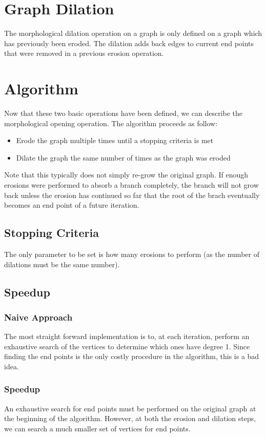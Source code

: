 \documentclass{InsightArticle}
\begin{document}
\section{Graph Dilation}
The morphological dilation operation on a graph is only defined on a graph which has previously been eroded. The dilation adds back edges to current end points that were removed in a previous erosion operation.

\section{Algorithm}
\label{sec:Algorithm}
Now that these two basic operations have been defined, we can describe the morphological opening operation. The algorithm proceeds as follow:
\begin{itemize}
 \item Erode the graph multiple times until a stopping criteria is met
 \item Dilate the graph the same number of times as the graph was eroded
\end{itemize}

Note that this typically does not simply re-grow the original graph. If enough erosions were performed to absorb a branch completely, the branch will not grow back unless the erosion has continued so far that the root of the brach eventually becomes an end point of a future iteration.

\subsection{Stopping Criteria}
The only parameter to be set is how many erosions to perform (as the number of dilations must be the same number).

\subsection{Speedup}
\subsubsection{Naive Approach}
The most straight forward implementation is to, at each iteration, perform an exhaustive search of the vertices to determine which ones have degree 1. Since finding the end points is the only costly procedure in the algorithm, this is a bad idea.

\subsubsection{Speedup}
An exhaustive search for end points must be performed on the original graph at the beginning of the algorithm. However, at both the erosion and dilation steps, we can search a much smaller set of vertices for end points.
\end{document}
